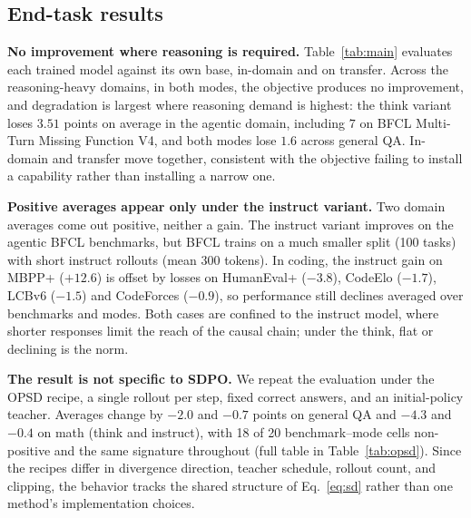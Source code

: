 \documentclass{article}
\begin{document}
\subsection{End-task results}
\label{sec:mainresults}

\textbf{No improvement where reasoning is required.} Table~\ref{tab:main} evaluates each trained model against its own base, in-domain and on transfer. Across the reasoning-heavy domains, in both modes, the objective produces no improvement, and degradation is largest where reasoning demand is highest: the think variant loses $3.51$ points on average in the agentic domain, including $7$ on BFCL Multi-Turn Missing Function V4, and both modes lose $1.6$ across general QA. In-domain and transfer move together, consistent with the objective failing to install a capability rather than installing a narrow one.


\textbf{Positive averages appear only under the instruct variant.} Two domain averages come out positive, neither a gain. The instruct variant improves on the agentic BFCL benchmarks, but BFCL trains on a much smaller split (100 tasks) with short instruct rollouts (mean 300 tokens). In coding, the instruct gain on MBPP+ ($+12.6$) is offset by losses on HumanEval+ ($-3.8$), CodeElo ($-1.7$), LCBv6 ($-1.5$) and CodeForces ($-0.9$), so performance still declines averaged over benchmarks and modes. Both cases are confined to the instruct model, where shorter responses limit the reach of the causal chain; under the think, flat or declining is the norm.


\textbf{The result is not specific to SDPO.} We repeat the evaluation under the OPSD recipe, a single rollout per step, fixed correct answers, and an initial-policy teacher. Averages change by $-2.0$ and $-0.7$ points on general QA and $-4.3$ and $-0.4$ on math (think and instruct), with 18 of 20 benchmark--mode cells non-positive and the same signature throughout (full table in Table~\ref{tab:opsd}). Since the recipes differ in divergence direction, teacher schedule, rollout count, and clipping, the behavior tracks the shared structure of Eq.~\eqref{eq:sd} rather than one method's implementation choices.
\end{document}
